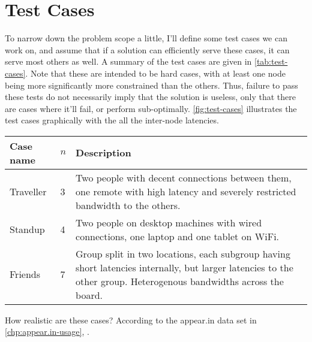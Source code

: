 \chapter{Test Cases}\label{chp:test-cases}

To narrow down the problem scope a little, I'll define some test cases we can work on, and assume that if a solution can efficiently serve these cases, it can serve most others as well. A summary of the test cases are given in \autoref{tab:test-cases}. Note that these are intended to be hard cases, with at least one node being more significantly more constrained than the others. Thus, failure to pass these tests do not necessarily imply that the solution is useless, only that there are cases where it'll fail, or perform sub-optimally. \autoref{fig:test-cases} illustrates the test cases graphically with the all the inter-node latencies.

\begin{center}
    \label{tab:test-cases}
    \begin{tabular}{| l | l | p{7cm} |}
    \hline
    \textbf{Case name} & \textbf{$n$} & \textbf{Description} \\ \hline
    Traveller & 3 & Two people with decent connections between them, one remote with high latency and severely restricted bandwidth to the others. \\ \hline
    Standup & 4 & Two people on desktop machines with wired connections, one laptop and one tablet on WiFi. \\ \hline
    Friends & 7 & Group split in two locations, each subgroup having short latencies internally, but larger latencies to the other group. Heterogenous bandwidths across the board. \\ \hline
    \end{tabular}
\end{center}

How realistic are these cases? According to the appear.in data set in \autoref{chp:appear.in-usage}, .


